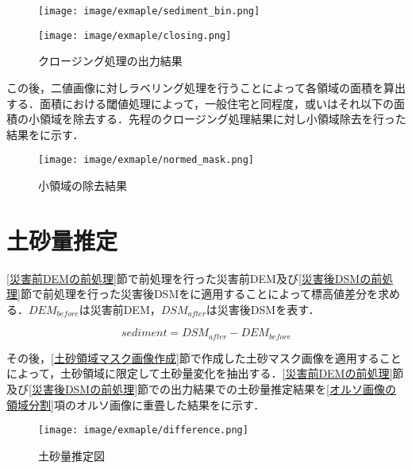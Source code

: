       \begin{figure}[t]
        \begin{minipage}[c]{0.45\hsize}
          \centering
          \texttt{[image: image/exmaple/sediment\_bin.png]}
        \end{minipage}
        \begin{minipage}[c]{0.45\hsize}
          \centering
          \texttt{[image: image/exmaple/closing.png]}
        \end{minipage}
        \caption{クロージング処理の出力結果}
        \label{クロージング処理}
      \end{figure}

      この後，二値画像に対しラベリング処理を行うことによって各領域の面積を算出する．面積における閾値処理によって，一般住宅と同程度，或いはそれ以下の面積の小領域を除去する．先程のクロージング処理結果に対し小領域除去を行った結果をに示す．
      
      \begin{figure}[t]
        \centering
        \texttt{[image: image/exmaple/normed\_mask.png]}
        \caption{小領域の除去結果}
        \label{小領域除去}
      \end{figure}



  \section{土砂量推定}
    \label{土砂量推定}
    \ref{災害前DEMの前処理}節で前処理を行った災害前DEM及び\ref{災害後DSMの前処理}節で前処理を行った災害後DSMをに適用することによって標高値差分を求める．$DEM_{before}$は災害前DEM，$DSM_{after}$は災害後DSMを表す．
    
    \begin{equation}
      \label{土砂量推定式}
      sediment = DSM_{after} - DEM_{before}
    \end{equation}

    その後，\ref{土砂領域マスク画像作成}節で作成した土砂マスク画像を適用することによって，土砂領域に限定して土砂量変化を抽出する．\ref{災害前DEMの前処理}節及び\ref{災害後DSMの前処理}節での出力結果での土砂量推定結果を\ref{オルソ画像の領域分割}項のオルソ画像に重畳した結果をに示す．

    \begin{figure}[t]
      \centering
      \texttt{[image: image/exmaple/difference.png]}
      \caption{土砂量推定図}
      \label{土砂量推定結果}
    \end{figure}



